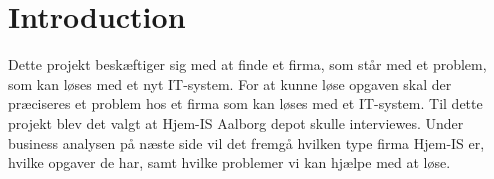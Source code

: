 \chapter{Introduction}\label{ch:introduction}
Dette projekt beskæftiger sig med at finde et firma, som står med et problem, som kan løses med et nyt IT-system. For at kunne løse opgaven skal der præciseres et problem hos et firma som kan løses med et IT-system. Til dette projekt blev det valgt at Hjem-IS Aalborg depot skulle interviewes. Under business analysen på næste side vil det fremgå hvilken type firma Hjem-IS er, hvilke opgaver de har, samt hvilke problemer vi kan hjælpe med at løse.
